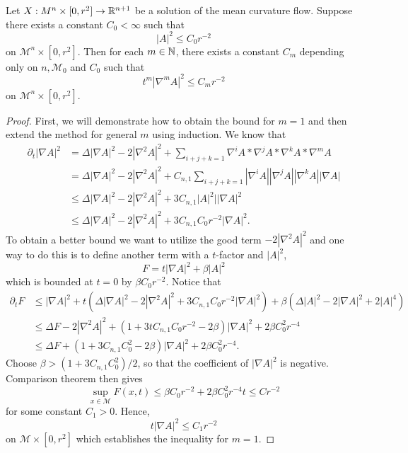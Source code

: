 \begin{lemma}
    Let $ X : M^{n} \times [0,r^{2}] \to \mathbb{R}^{n+1}  $ be a solution of the mean curvature flow. Suppose there exists a constant $ C_{0} < \infty$ such that 
    \[ |A|^{2} \le C_{0}r^{-2} \]
    on $ \mathcal{M}^{n} \times [0,r^{2}] $. Then for each $ m \in \mathbb{N} $, there exists a constant $ C_{m} $ depending only on $ n, \mathcal{M}_{0} $ and $C_{0} $ such that 
    \[ t^{m}|\nabla^{m}A|^{2} \le C_{m}r^{-2} \]
    on $ \mathcal{M}^{n} \times [0,r^{2}] $. 
\end{lemma}
\begin{proof}
    First, we will demonstrate how to obtain the bound for $ m=1 $ and then extend the method for general $ m $ using induction. We know that 
    \begin{align*}
        \partial_{t}|\nabla A|^{2} & = \Delta|\nabla A|^{2}-2|\nabla^{2} A|^{2} + \sum_{i+j+k=1}^{}\nabla^{i}A* \nabla^{j}A *\nabla^{k}A * \nabla^{m}A \\
        & = \Delta|\nabla A|^{2}-2|\nabla^{2} A|^{2} + C_{n,1} \sum_{i+j+k=1}^{}|\nabla^{i}A||\nabla^{j}A| |\nabla^{k}A||\nabla A|  \\
        & \le \Delta|\nabla A|^{2} -2 |\nabla^{2} A|^{2}+3C_{n,1}|A|^{2}||\nabla A|^{2} \\
        & \le \Delta|\nabla A|^{2} -2 |\nabla^{2} A|^{2}+3C_{n,1}C_{0}r^{-2}|\nabla A|^{2}.
    \end{align*}
    To obtain a better bound we want to utilize the good term $ -2|\nabla^{2}A|^{2} $ and one way to do this is to define another term with a $ t $-factor and $ |A|^{2} $,
    \[ F = t|\nabla A|^{2} + \beta|A|^{2}\]
    which is bounded at $ t=0 $ by $ \beta C_{0}r^{-2} $. Notice that \begin{align*}
        \partial_{t}F & \le |\nabla A|^{2}+ t\left(\Delta|\nabla A|^{2}-2|\nabla^{2} A|^{2} +3C_{n,1}C_{0}r^{-2}|\nabla A|^{2} \right) + \beta\left( \Delta |A|^{2}- 2|\nabla A|^{2} + 2|A|^{4} \right) \\
        & \le \Delta F -2|\nabla^{2}A|^{2}+  \left(1 +3tC_{n,1}C_{0}r^{-2}-2\beta  \right) |\nabla A|^{2} + 2\beta C_{0}^{2}r^{-4} \\
        & \le \Delta F + \left( 1+ 3C_{n,1}C_{0}^{2}-2 \beta \right)| \nabla A|^{2} + 2 \beta C_{0}^{2}r^{-4}.
    \end{align*}
    Choose  $ \beta > (1+3C_{n,1}C_{0}^{2}) /2 $, so that the coefficient of $ |\nabla A|^{2} $ is negative. Comparison theorem then gives 
    \[ \sup_{ x \in \mathcal{M} }F(x,t) \le \beta C_{0}r^{-2}+ 2 \beta C_{0}^{2}r^{-4}t \le Cr^{-2} \]
    for some constant $ C_{1} >0 $. Hence, 
    \[ t|\nabla A|^{2} \le C_{1}r^{-2} \]
    on $ \mathcal{M} \times [0,r^{2}] $ which establishes the inequality for $ m=1 $. 


\end{proof}
